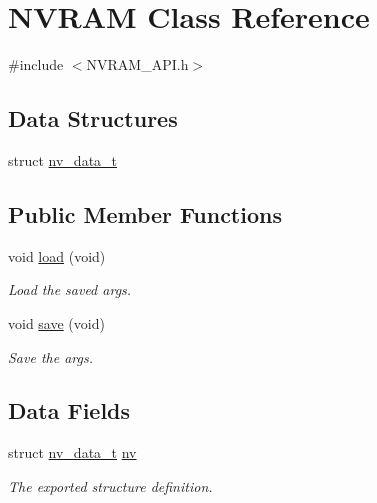 \hypertarget{class_n_v_r_a_m}{\section{N\-V\-R\-A\-M Class Reference}
\label{class_n_v_r_a_m}
}


{\ttfamily \#include $<$N\-V\-R\-A\-M\-\_\-\-A\-P\-I.\-h$>$}

\subsection*{Data Structures}
\begin{DoxyCompactItemize}
\item 
struct \hyperlink{struct_n_v_r_a_m_1_1nv__data__t}{nv\-\_\-data\-\_\-t}
\end{DoxyCompactItemize}
\subsection*{Public Member Functions}
\begin{DoxyCompactItemize}
\item 
void \hyperlink{class_n_v_r_a_m_ae3ecf3de99da1d7bdcdae60c64e4e86e}{load} (void)
\begin{DoxyCompactList}\small\item\em Load the saved args. \end{DoxyCompactList}\item 
void \hyperlink{class_n_v_r_a_m_afbe85bcab715f26c786f5c9d818acbc3}{save} (void)
\begin{DoxyCompactList}\small\item\em Save the args. \end{DoxyCompactList}\end{DoxyCompactItemize}
\subsection*{Data Fields}
\begin{DoxyCompactItemize}
\item 
struct \hyperlink{struct_n_v_r_a_m_1_1nv__data__t}{nv\-\_\-data\-\_\-t} \hyperlink{class_n_v_r_a_m_a1fecdef48ed8493825e95b1d471883fc}{nv}
\begin{DoxyCompactList}\small\item\em The exported structure definition. \end{DoxyCompactList}\end{DoxyCompactItemize}



